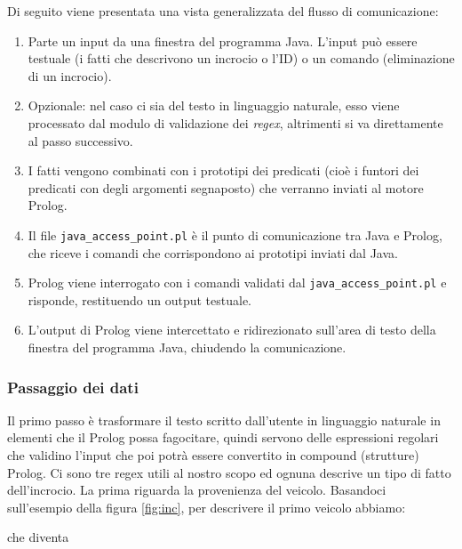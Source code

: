 Di seguito viene presentata una vista generalizzata del flusso di comunicazione:
\begin{enumerate}
	\item Parte un input da una finestra del programma Java. L'input può essere testuale (i fatti che descrivono un incrocio o l'ID) o un comando (eliminazione di un incrocio).
	\item Opzionale: nel caso ci sia del testo in linguaggio naturale, esso viene processato dal modulo di validazione dei \textit{regex}, altrimenti si va direttamente al passo successivo.
	\item I fatti vengono combinati con i prototipi dei predicati (cioè i funtori dei predicati con degli argomenti segnaposto) che verranno inviati al motore Prolog.
	\item Il file \texttt{java\_access\_point.pl} è il punto di comunicazione tra Java e Prolog, che riceve i comandi che corrispondono ai prototipi inviati dal Java.
	\item Prolog viene interrogato con i comandi validati dal \texttt{java\_access\_point.pl} e risponde, restituendo un output testuale.
	\item L'output di Prolog viene intercettato e ridirezionato sull'area di testo della finestra del programma Java, chiudendo la comunicazione.
\end{enumerate}

\subsubsection{Passaggio dei dati}
\label{sssec:jap}
Il primo passo è trasformare il testo scritto dall'utente in linguaggio naturale in elementi che il Prolog possa fagocitare, quindi servono delle espressioni regolari che validino l'input che poi potrà essere convertito in compound (strutture) Prolog. Ci sono tre regex utili al nostro scopo ed ognuna descrive un tipo di fatto dell'incrocio.
La prima riguarda la provenienza del veicolo. Basandoci sull'esempio della figura \ref{fig:inc}, per descrivere il primo veicolo abbiamo: \\
\setlength{\fboxsep}{6pt}
\setlength{\fboxrule}{3pt}

\par \mbox{} 
\begin{flushleft}
	che diventa
\end{flushleft}
\par \mbox{}

